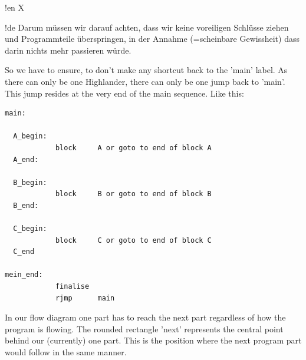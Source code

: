 !en X

!de Darum müssen wir darauf achten, dass wir keine voreiligen Schlüsse ziehen und Programmteile überspringen, in der Annahme (=scheinbare Gewissheit) dass darin nichts mehr passieren würde.



So we have to ensure, to don't make any shortcut back to the 'main' label. As there can only be one Highlander, there can only be one jump back to 'main'. This jump resides at the very end of the main sequence. Like this:

\begin{lstlisting}
main:

  A_begin:
            block     A or goto to end of block A
  A_end:

  B_begin:
            block     B or goto to end of block B
  B_end:

  C_begin:
            block     C or goto to end of block C
  C_end

mein_end:
            finalise
            rjmp      main
\end{lstlisting}

In our flow diagram one part has to reach the next part regardless of how the program is flowing. The rounded rectangle 'next' represents the central point behind our (currently) one part. This is the position where the next program part would follow in the same manner.

